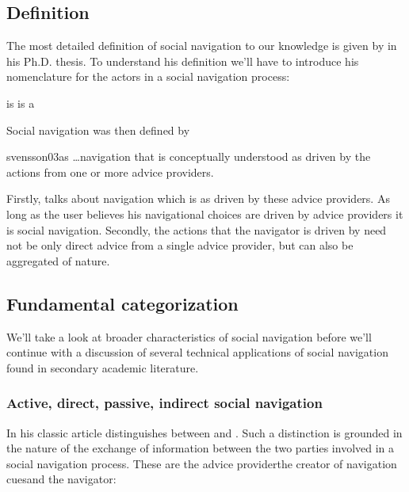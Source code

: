 \subsection{Definition}

The most detailed definition of social navigation to our knowledge is
given by \citet{svensson03} in his Ph.D. thesis. To understand his
definition we'll have to introduce his nomenclature for the actors in a social
navigation process:

\begin{items}
   is 
   is a 
\end{items}

Social navigation was then defined by
\begin{fullquote}[\p{20}]{svensson03}{as}
  \dots navigation that is conceptually understood as driven by the actions
  from one or more advice providers.
\end{fullquote}

Firstly, \citeauthor{svensson03} talks about navigation which is
 as driven by these advice providers. As long as
the user believes his navigational choices are driven by advice providers it
is social navigation. Secondly, the actions that the navigator is driven by
need not be only direct advice from a single advice provider, but can also be
aggregated of nature.

\subsection{Fundamental categorization}
\label{section:social.navigation.fundamental.categorization}

We'll take a look at broader characteristics of social navigation
before we'll continue with a discussion of several technical applications of
social navigation found in secondary academic literature.

\subsubsection{Active, direct, passive, \oldand indirect social navigation}

In his classic article \citet{dieberger97} distinguishes between
 and .
Such a distinction is grounded in the nature of the exchange of information
between the two parties involved in a social navigation process.
These are the advice provider\dash{}the creator of navigation
cues\dash{}and the navigator:

